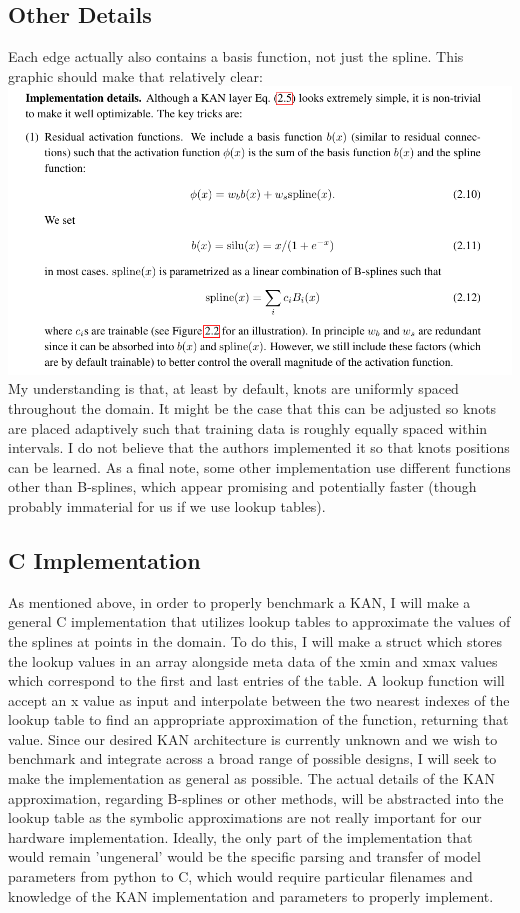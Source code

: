 \documentclass{article}
\begin{document}
\subsection{Other Details}
Each edge actually also contains a basis function, not just the spline. This graphic should make that relatively clear:\\
\includegraphics[scale=0.5]{figure2.png}\\
My understanding is that, at least by default, knots are uniformly spaced throughout the domain. It might be the case that this can be adjusted so knots are placed adaptively such that training data is roughly equally spaced within intervals. I do not believe that the authors implemented it so that knots positions can be learned. As a final note, some other implementation use different functions other than B-splines, which appear promising and potentially faster (though probably immaterial for us if we use lookup tables).

\subsection{C Implementation}
As mentioned above, in order to properly benchmark a KAN, I will make a general C implementation that utilizes lookup tables to approximate the values of the splines at points in the domain. To do this, I will make a struct which stores the lookup values in an array alongside meta data of the xmin and xmax values which correspond to the first and last entries of the table. A lookup function will accept an x value as input and interpolate between the two nearest indexes of the lookup table to find an appropriate approximation of the function, returning that value. Since our desired KAN architecture is currently unknown and we wish to benchmark and integrate across a broad range of possible designs, I will seek to make the implementation as general as possible. The actual details of the KAN approximation, regarding B-splines or other methods, will be abstracted into the lookup table as the symbolic approximations are not really important for our hardware implementation. Ideally, the only part of the implementation that would remain 'ungeneral' would be the specific parsing and transfer of model parameters from python to C, which would require particular filenames and knowledge of the KAN implementation and parameters to properly implement.
\end{document}
